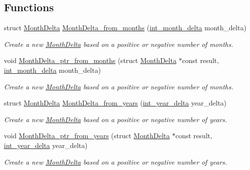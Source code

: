 \subsection*{Functions}
\begin{DoxyCompactItemize}
\item 
struct \hyperlink{structMonthDelta}{Month\-Delta} \hyperlink{month-delta_8h_ab2435ae92655bed23406d37b4b8f4750}{Month\-Delta\-\_\-from\-\_\-months} (\hyperlink{types_8h_adc711c00c117528b40875ad0119c687f}{int\-\_\-month\-\_\-delta} month\-\_\-delta)
\begin{DoxyCompactList}\small\item\em Create a new \hyperlink{structMonthDelta}{Month\-Delta} based on a positive or negative number of months. \end{DoxyCompactList}\item 
void \hyperlink{month-delta_8h_aceffd9f2084cfb19dd1d1ca97262d042}{Month\-Delta\-\_\-ptr\-\_\-from\-\_\-months} (struct \hyperlink{structMonthDelta}{Month\-Delta} $\ast$const result, \hyperlink{types_8h_adc711c00c117528b40875ad0119c687f}{int\-\_\-month\-\_\-delta} month\-\_\-delta)
\begin{DoxyCompactList}\small\item\em Create a new \hyperlink{structMonthDelta}{Month\-Delta} based on a positive or negative number of months. \end{DoxyCompactList}\item 
struct \hyperlink{structMonthDelta}{Month\-Delta} \hyperlink{month-delta_8h_aec5607ad9e7e090c39b2f50a68974ef0}{Month\-Delta\-\_\-from\-\_\-years} (\hyperlink{types_8h_ad2a6eecbd190f1ae0327acdeaf596623}{int\-\_\-year\-\_\-delta} year\-\_\-delta)
\begin{DoxyCompactList}\small\item\em Create a new \hyperlink{structMonthDelta}{Month\-Delta} based on a positive or negative number of years. \end{DoxyCompactList}\item 
void \hyperlink{month-delta_8h_aa24bad37840cbe1c55345246a58a635a}{Month\-Delta\-\_\-ptr\-\_\-from\-\_\-years} (struct \hyperlink{structMonthDelta}{Month\-Delta} $\ast$const result, \hyperlink{types_8h_ad2a6eecbd190f1ae0327acdeaf596623}{int\-\_\-year\-\_\-delta} year\-\_\-delta)
\begin{DoxyCompactList}\small\item\em Create a new \hyperlink{structMonthDelta}{Month\-Delta} based on a positive or negative number of years. \end{DoxyCompactList}\item 

\end{DoxyCompactItemize}
